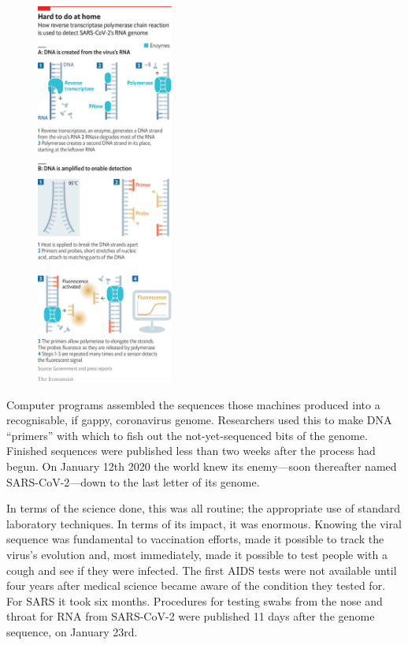 \documentclass{article}
\begin{document}
\begin{figure}[h]
\centering
\includegraphics[width=0.4\textwidth]{images/20210327_TQC933.png}
\end{figure}


Computer programs assembled the sequences those machines produced into a recognisable, if gappy, coronavirus genome. Researchers used this to make DNA ``primers'' with which to fish out the not-yet-sequenced bits of the genome. Finished sequences were published less than two weeks after the process had begun. On January 12th 2020 the world knew its enemy---soon thereafter named SARS-CoV-2---down to the last letter of its genome. 

In terms of the science done, this was all routine; the appropriate use of standard laboratory techniques. In terms of its impact, it was enormous. Knowing the viral sequence was fundamental to vaccination efforts, made it possible to track the virus's evolution and, most immediately, made it possible to test people with a cough and see if they were infected. The first AIDS tests were not available until four years after medical science became aware of the condition they tested for. For SARS it took six months. Procedures for testing swabs from the nose and throat for RNA from SARS-CoV-2 were published 11 days after the genome sequence, on January 23rd. 
\end{document}

